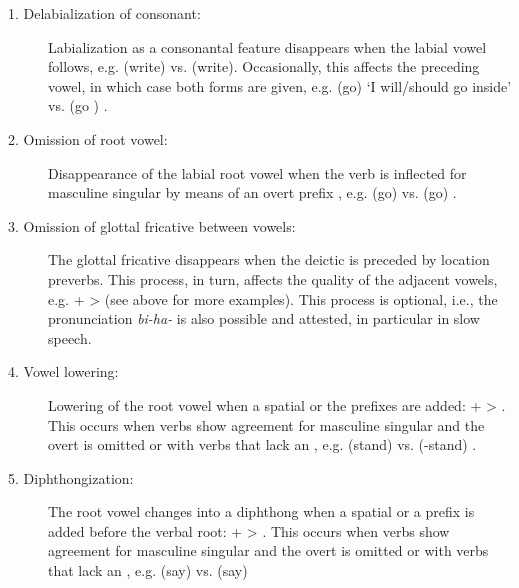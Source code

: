 {\sloppy\begin{description}
\item[1. Delabialization of consonant:] Labialization as a consonantal feature disappears when the labial vowel  follows, e.g.  (write) vs.  (write). Occasionally, this affects the preceding vowel, in which case both forms are given, e.g.  (go) `I will\slash should go inside' vs.  (go ) .

\item[2. Omission of root vowel:] Disappearance of the labial root vowel when the verb is inflected for masculine singular by means of an overt prefix , e.g.  (go)  vs.  (go) .

\item[3. Omission of glottal fricative between vowels:] The glottal fricative disappears when the deictic   is preceded by location preverbs. This process, in turn, affects the quality of the adjacent vowels, e.g.  +  >  (see  above for more examples). This process is optional, i.e., the pronunciation \textit{bi-ha-} is also possible and attested, in particular in slow speech.

\item[4. Vowel lowering:] Lowering of the root vowel  when a spatial   or the  prefixes  are added:  +  > . This occurs when verbs show agreement for masculine singular and the overt  is omitted or with verbs that lack an , e.g.  (stand)  vs.  (-stand) .

\item[5. Diphthongization:] The root vowel  changes into a diphthong when a spatial   or a  prefix  is added before the verbal root:  +  > . This occurs when verbs show agreement for masculine singular and the overt  is omitted or with verbs that lack an , e.g.  (say)  vs.  (say) 


\end{description}}
